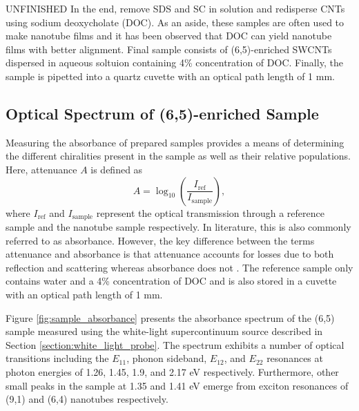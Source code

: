 {\color{red} UNFINISHED} In the end, remove SDS and SC in solution and redisperse CNTs using sodium deoxycholate (DOC). As an aside, these samples are often used to make nanotube films and it has been observed that DOC can yield nanotube films with better alignment. Final sample consists of (6,5)-enriched SWCNTs dispersed in aqueous soltuion containing 4\% concentration of DOC. Finally, the sample is pipetted into a quartz cuvette with an optical path length of 1 mm. 

\subsection{Optical Spectrum of (6,5)-enriched Sample}

Measuring the absorbance of prepared samples provides a means of determining the different chiralities present in the sample as well as their relative populations. Here, attenuance $A$ is defined as 
\begin{equation}
A = \log_{10}\left(\dfrac{I_{\mathrm{ref}}}{I_{\mathrm{sample}}}\right),
\end{equation}
where $I_{\mathrm{ref}}$ and $I_{\mathrm{sample}}$ represent the optical transmission through a reference sample and the nanotube sample respectively. In literature, this is also commonly referred to as absorbance. However, the key difference between the terms attenuance and absorbance is that attenuance accounts for losses due to both reflection and scattering whereas absorbance does not \cite{dixon1992absorbance}. The reference sample only contains water and a 4\% concentration of DOC and is also stored in a cuvette with an optical path length of 1 mm. 

Figure \ref{fig:sample_absorbance} presents the absorbance spectrum of the (6,5) sample measured using the white-light supercontinuum source described in Section \ref{section:white_light_probe}. The spectrum exhibits a number of optical transitions including the $E_{11}$, phonon sideband, $E_{12}$, and $E_{22}$ resonances at photon energies of 1.26, 1.45, 1.9, and 2.17 eV respectively. Furthermore, other small peaks in the sample at 1.35 and 1.41 eV emerge from exciton resonances of (9,1) and (6,4) nanotubes respectively.

